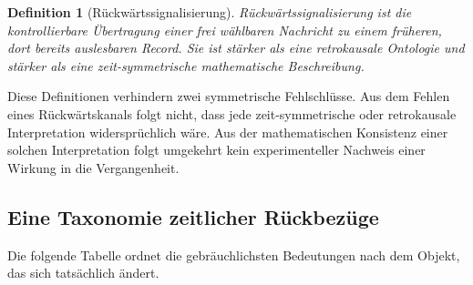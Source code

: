 \documentclass[11pt,a4paper]{article}
\newtheorem{definition}{Definition}[section]
\theoremstyle{remark}
\begin{document}
\begin{definition}[Rückwärtssignalisierung]
Rückwärtssignalisierung ist die kontrollierbare Übertragung einer frei
wählbaren Nachricht zu einem früheren, dort bereits auslesbaren Record. Sie
ist stärker als eine retrokausale Ontologie und stärker als eine
zeit-symmetrische mathematische Beschreibung.
\end{definition}

Diese Definitionen verhindern zwei symmetrische Fehlschlüsse. Aus dem Fehlen
eines Rückwärtskanals folgt nicht, dass jede zeit-symmetrische oder
retrokausale Interpretation widersprüchlich wäre. Aus der mathematischen
Konsistenz einer solchen Interpretation folgt umgekehrt kein experimenteller
Nachweis einer Wirkung in die Vergangenheit.

\subsection{Eine Taxonomie zeitlicher Rückbezüge}

Die folgende Tabelle ordnet die gebräuchlichsten Bedeutungen nach dem Objekt,
das sich tatsächlich ändert.
\end{document}
